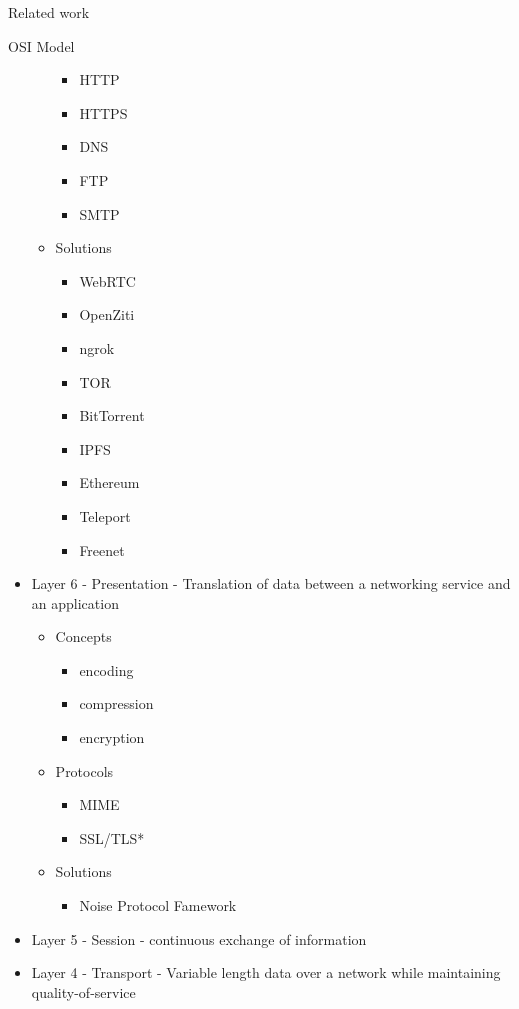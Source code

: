 \begin{frame}[fragile]{Related work}
\begin{block}{OSI Model}
\begin{itemize}
\begin{itemize}
    \begin{itemize}
    \tightlist
    \item
      HTTP
    \item
      HTTPS
    \item
      DNS
    \item
      FTP
    \item
      SMTP
    \end{itemize}
  \item
    Solutions

    \begin{itemize}
    \tightlist
    \item
      WebRTC
    \item
      OpenZiti
    \item
      ngrok
    \item
      TOR
    \item
      BitTorrent
    \item
      IPFS
    \item
      Ethereum
    \item
      Teleport
    \item
      Freenet
    \end{itemize}
  \end{itemize}
\item
  Layer 6 - Presentation - Translation of data between a networking
  service and an application

  \begin{itemize}
  \tightlist
  \item
    Concepts

    \begin{itemize}
    \tightlist
    \item
      encoding
    \item
      compression
    \item
      encryption
    \end{itemize}
  \item
    Protocols

    \begin{itemize}
    \tightlist
    \item
      MIME
    \item
      SSL/TLS*
    \end{itemize}
  \item
    Solutions

    \begin{itemize}
    \tightlist
    \item
      Noise Protocol Famework
    \end{itemize}
  \end{itemize}
\item
  Layer 5 - Session - continuous exchange of information
\item
  Layer 4 - Transport - Variable length data over a network while
  maintaining quality-of-service


\end{itemize}
\end{block}
\end{frame}
